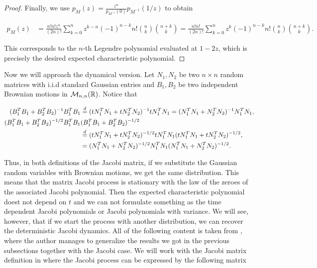 \begin{proof}
Finally, we use \( p_{M}(z) = \frac{z^n}{p_{M^{-1}}(0)} p_{M^{-1}}(1/z) \) to obtain

\begin{align*}
    p_{M}(z) &= \frac{n!n!z^n}{(2n)!} \sum_{k=0}^n z^{k-n}(-1)^{n-k}n!\binom{n}{k} \binom{n+k}{k} = \frac{n!n!}{(2n)!}\sum_{k=0}^n z^{k}(-1)^{n-k}n!\binom{n}{k} \binom{n+k}{k}.
\end{align*}

This corresponds to the \(n\)-th Legendre polynomial evaluated at \( 1-2z \), which is precisely the desired expected characteristic polynomial.
\end{proof}

Now we will approach the dynamical version. Let $N_1,N_2$ be two $n\times n$ random matrices with i.i.d standard Gaussian entries and $B_1, B_2$ be two independent Brownian motions in $\mathcal M_{n,n}(\mathbb R)$. Notice that 

\begin{align*}
    (B_1^T B_1 + B_2^T B_2)^{-1} B_1^TB_1 &\overset{d}= (tN_1^T N_1 + tN_2^T N_2)^{-1} tN_1^TN_1 = (N_1^T N_1 + N_2^T N_2)^{-1} N_1^TN_1,\\
    (B_1^T B_1 + B_2^T B_2)^{-1/2} B_1^TB_1& (B_1^T B_1 + B_2^T B_2)^{-1/2} \\ &\overset{d}=(tN_1^T N_1 + tN_2^T N_2)^{-1/2} tN_1^TN_1 (tN_1^T N_1 + tN_2^T N_2)^{-1/2},\\
    &=(N_1^T N_1 + N_2^T N_2)^{-1/2} N_1^TN_1 (N_1^T N_1 + N_2^T N_2)^{-1/2}.
\end{align*}

Thus, in both definitions of the Jacobi matrix, if we substitute the Gaussian random variables with Brownian motions, we get the same distribution. This means that the matrix Jacobi process is stationary with the law of the zeroes of the associated Jacobi polynomial. Then the expected characteristic polynomial doest not depend on $t$ and we can not formulate something as the time dependent Jacobi polynomials or Jacobi polynomials with variance. We will see, however, that if we start the process with another distribution, we can recover the deterministic Jacobi dynamics. All of the following content is taken from \cite{article:marcus_finite_free_point_processes}, where the author manages to generalize the results we got in the previous subsections together with the Jacobi case. We will work with the Jacobi matrix definition in \cite{doumerc2005matrices} where the Jacobi process can be expressed by the following matrix

